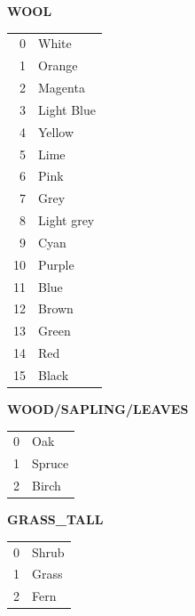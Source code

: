 \documentclass[twocolumn]{geocraft-worksheet-multipage}
\begin{document}
\clearpage

\textbf{WOOL}
\begin{center}




    \tabletail{\hline}

    \tablelasttail{\hline}


\begin{supertabular} { | r | l | }
0 & White \\
1 & Orange \\
2 & Magenta \\
3 & Light Blue \\
4 & Yellow \\
5 & Lime \\
6 & Pink \\
7 & Grey \\
8 & Light grey \\
9 & Cyan \\
10 & Purple \\
11 & Blue \\
12 & Brown \\
13 &Green \\
14 & Red \\
15 & Black \\
\end{supertabular}
\end{center}\vspace{-0.1cm}

\textbf{WOOD/SAPLING/LEAVES}\vspace{-0.3cm}
\begin{center}
\begin{supertabular} { | r | l | }
0 & Oak \\
1 & Spruce \\
2 & Birch \\
\end{supertabular}
\end{center}

\textbf{GRASS\_TALL}\vspace{-0.3cm}
\begin{center}
\begin{supertabular} { | r | l | }
0 & Shrub \\
1 & Grass \\
2 & Fern \\
\end{supertabular}
\end{center}
\end{document}
